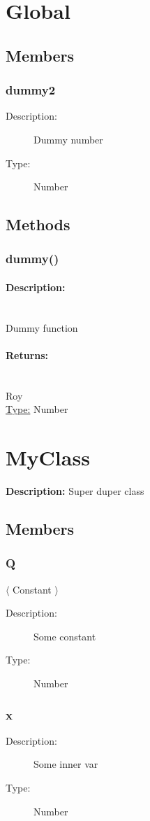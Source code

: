 \section{Global} 
\subsection{Members} 
\subsubsection{dummy2} 
\begin{description} 
\item[Description:]Dummy number
\item[Type:]Number
\end{description} 
\subsection{Methods} 
\subsubsection{dummy()} 
\paragraph{Description:} \hfill \\ 
Dummy function
\paragraph{Returns:} \hfill \\ 
Roy\\ 
\underline{Type:} Number
\section{MyClass} 
\textbf{Description: }Super duper class
\subsection{Members} 
\subsubsection{Q} 
$\langle$ Constant $\rangle$ 
\begin{description} 
\item[Description:]Some constant
\item[Type:]Number
\end{description} 
\subsubsection{x} 
\begin{description} 
\item[Description:]Some inner var
\item[Type:]Number
\end{description} 
